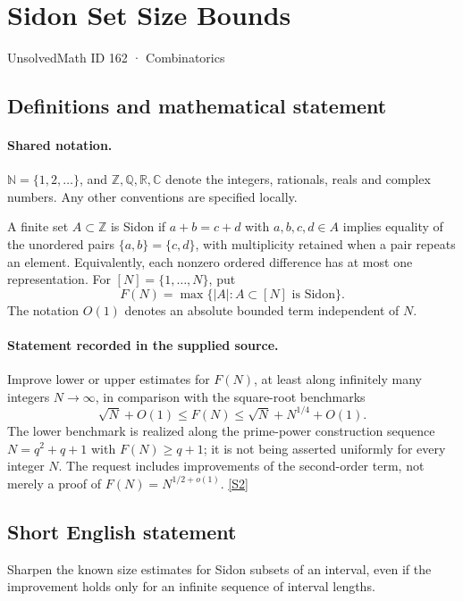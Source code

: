 \documentclass[11pt]{article}
\newcommand{\sref}[2]{\hyperlink{source:#1:#2}{[S#2]}}
\begin{document}
\setcounter{section}{161}
\section{Sidon Set Size Bounds}\label{162}
{\small\sffamily UnsolvedMath ID 162 · Combinatorics}
\subsection{Definitions and mathematical statement}

\paragraph{Shared notation.}$\mathbb N=\{1,2,\ldots\}$, and $\mathbb Z,\mathbb Q,\mathbb R,\mathbb C$ denote the integers, rationals, reals and complex numbers. Any other conventions are specified locally.


A finite set $A\subset\mathbb Z$ is Sidon if $a+b=c+d$ with $a,b,c,d\in A$ implies equality of the unordered pairs $\{a,b\}=\{c,d\}$, with multiplicity retained when a pair repeats an element. Equivalently, each nonzero ordered difference has at most one representation. For $[N]=\{1,\ldots,N\}$, put
\[
 F(N)=\max\{|A|:A\subset[N]\text{ is Sidon}\}.
\]
The notation $O(1)$ denotes an absolute bounded term independent of $N$.
\paragraph{Statement recorded in the supplied source.}
Improve lower or upper estimates for $F(N)$, at least along infinitely many integers $N\to\infty$, in comparison with the square-root benchmarks
\[
 \sqrt N+O(1)\leq F(N)\leq\sqrt N+N^{1/4}+O(1).
\]
The lower benchmark is realized along the prime-power construction sequence $N=q^2+q+1$ with $F(N)\geq q+1$; it is not being asserted uniformly for every integer $N$. The request includes improvements of the second-order term, not merely a proof of $F(N)=N^{1/2+o(1)}$. \sref{162}{2}
\subsection{Short English statement}
Sharpen the known size estimates for Sidon subsets of an interval, even if the improvement holds only for an infinite sequence of interval lengths.
\end{document}
